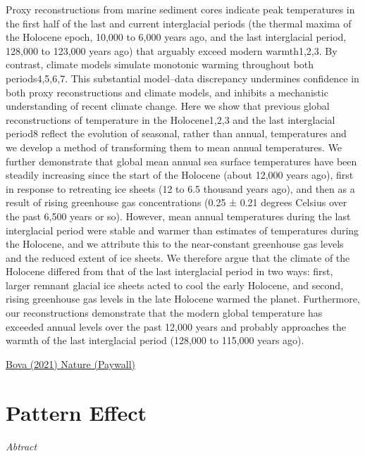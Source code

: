 \documentclass[
]{book}
\begin{document}
Proxy reconstructions from marine sediment cores indicate peak temperatures in the first half of the last and current interglacial periods (the thermal maxima of the Holocene epoch, 10,000 to 6,000 years ago, and the last interglacial period, 128,000 to 123,000 years ago) that arguably exceed modern warmth1,2,3. By contrast, climate models simulate monotonic warming throughout both periods4,5,6,7. This substantial model--data discrepancy undermines confidence in both proxy reconstructions and climate models, and inhibits a mechanistic understanding of recent climate change. Here we show that previous global reconstructions of temperature in the Holocene1,2,3 and the last interglacial period8 reflect the evolution of seasonal, rather than annual, temperatures and we develop a method of transforming them to mean annual temperatures. We further demonstrate that global mean annual sea surface temperatures have been steadily increasing since the start of the Holocene (about 12,000 years ago), first in response to retreating ice sheets (12 to 6.5 thousand years ago), and then as a result of rising greenhouse gas concentrations (0.25 ± 0.21 degrees Celsius over the past 6,500 years or so). However, mean annual temperatures during the last interglacial period were stable and warmer than estimates of temperatures during the Holocene, and we attribute this to the near-constant greenhouse gas levels and the reduced extent of ice sheets. We therefore argue that the climate of the Holocene differed from that of the last interglacial period in two ways: first, larger remnant glacial ice sheets acted to cool the early Holocene, and second, rising greenhouse gas levels in the late Holocene warmed the planet. Furthermore, our reconstructions demonstrate that the modern global temperature has exceeded annual levels over the past 12,000 years and probably approaches the warmth of the last interglacial period (128,000 to 115,000 years ago).

\href{https://www.nature.com/articles/s41586-020-03155-x}{Bova (2021) Nature (Paywall)}

\hypertarget{pattern-effect}{%
\chapter{Pattern Effect}\label{pattern-effect}}

\emph{Abtract}
\end{document}
